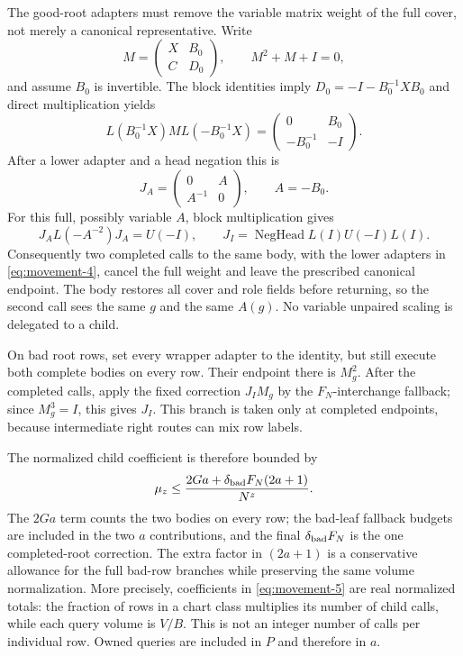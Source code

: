 The good-root adapters must remove the variable matrix weight of the full
cover, not merely a canonical representative. Write
\[
 M=\begin{pmatrix}X&B_0\\C&D_0\end{pmatrix},
 \qquad M^2+M+I=0,
\]
and assume $B_0$ is invertible. The block identities imply
$D_0=-I-B_0^{-1}XB_0$ and direct multiplication yields
\[
 L(B_0^{-1}X)M L(-B_0^{-1}X)
   =\begin{pmatrix}0&B_0\\-B_0^{-1}&-I\end{pmatrix}.
\]
After a lower adapter and a head negation this is
\[
 J_A=\begin{pmatrix}0&A\\A^{-1}&0\end{pmatrix},\qquad A=-B_0.
\]
For this full, possibly variable $A$, block multiplication gives
\begin{equation}
 J_A L(-A^{-2})J_A=U(-I),\qquad
 J_I=\operatorname{NegHead}L(I)U(-I)L(I).             \label{eq:movement-4}
\end{equation}
Consequently two completed calls to the same body, with the lower
adapters in \eqref{eq:movement-4}, cancel the full weight and leave the prescribed
canonical endpoint. The body restores all cover and role fields before
returning, so the second call sees the same $g$ and the same $A(g)$.
No variable unpaired scaling is delegated to a child.

On bad root rows, set every wrapper adapter to the identity, but still
execute both complete bodies on every row. Their endpoint there is
$M_g^2$. After the completed calls, apply the fixed correction $J_IM_g$
by the $F_N$-interchange fallback; since $M_g^3=I$, this gives $J_I$.
This branch is taken only at completed endpoints, because intermediate
right routes can mix row labels.

The normalized child coefficient is therefore bounded by
\begin{equation}
 \mu_z\le {2Ga+\delta_{\rm bad}F_N(2a+1)\over N^z}.       \label{eq:movement-5}
\end{equation}
The $2Ga$ term counts the two bodies on every row; the bad-leaf fallback
budgets are included in the two $a$ contributions, and the final
$\delta_{\rm bad}F_N$ is the one completed-root correction. The extra
factor in $(2a+1)$ is a conservative allowance for the full bad-row
branches while preserving the same volume normalization. More precisely,
coefficients in \eqref{eq:movement-5} are real normalized totals: the fraction of rows
in a chart class multiplies its number of child calls, while each query
volume is $V/B$. This is not an integer number of calls per individual
row. Owned queries are included in $P$ and therefore in $a$.

